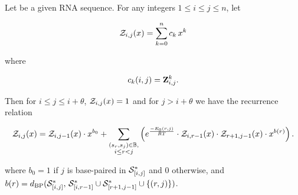 \begin{theorem}
\label{thm:fftbor:recursions}
Let \seqN be a given RNA sequence.
For any integers $1 \leq i \leq j \leq n$, let

\begin{align}
{\mathcal Z}_{i,j}(x) = \sum_{k=0}^n c_k\,x^k
\end{align}

where

\begin{align}
c_k(i,j) = {\bf Z}^{k}_{i,j}.
\end{align}

Then for $i\leq j \leq i+\theta$, ${\mathcal Z}_{i,j}(x)=1$ and for
$j>i+\theta$ we have the recurrence relation

\begin{align}
\label{eq:fftbor:fftborNussPoly}
\emZ{i,j} = \emZ{i,j-1} \cdot x^{b_0} +
\sum_{\substack{(s_r,s_j) \in \bpSet, \\ i\le r<j}}
\left(
\boltzNuss{r,j} \cdot \emZ{i,r-1} \cdot \emZ{r+1,j-1} \cdot x^{b(r)}
\right).
\end{align}

where $b_0 = 1$ if $j$ is base-paired in $\mathcal S^*_{[i,j]}$ and 0 otherwise, and
$b(r) =
d_{\text{BP}}(\mathcal S^*_{[i,j]},\,\mathcal S^*_{[i,r-1]} \cup \mathcal S^*_{[r+1,j-1]} \cup \{(r,j)\})$.
\end{theorem}

